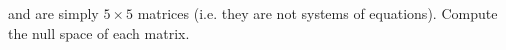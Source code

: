  and  
 are simply $5\times 5$ matrices (i.e. they are not systems of equations).  Compute the null space of each matrix.
